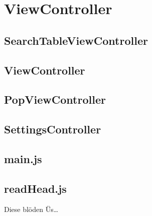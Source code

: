 
\section{ViewController}

\subsection{SearchTableViewController}
\subsection{ViewController}
\subsection{PopViewController}
\subsection{SettingsController}
\subsection{main.js}
\subsection{readHead.js}

Diese blöden Üs…

